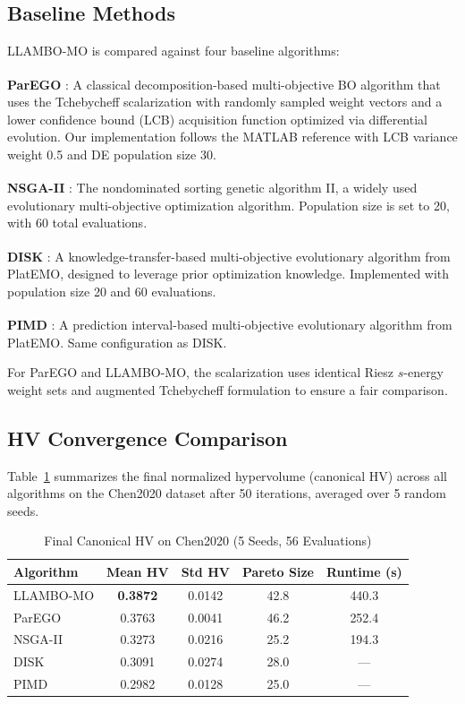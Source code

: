 \documentclass[lettersize,journal]{IEEEtran}
\let\OLDcite\cite
\renewcommand{\cite}[1]{\textsuperscript{\OLDcite{#1}}}
\begin{document}
\subsection{Baseline Methods}

LLAMBO-MO is compared against four baseline algorithms:

\textbf{ParEGO} \cite{ref_parego}: A classical decomposition-based multi-objective BO algorithm that uses the Tchebycheff scalarization with randomly sampled weight vectors and a lower confidence bound (LCB) acquisition function optimized via differential evolution. Our implementation follows the MATLAB reference with LCB variance weight 0.5 and DE population size 30.

\textbf{NSGA-II} \cite{ref_nsga2}: The nondominated sorting genetic algorithm II, a widely used evolutionary multi-objective optimization algorithm. Population size is set to 20, with 60 total evaluations.

\textbf{DISK} \cite{ref_platemo}: A knowledge-transfer-based multi-objective evolutionary algorithm from PlatEMO, designed to leverage prior optimization knowledge. Implemented with population size 20 and 60 evaluations.

\textbf{PIMD} \cite{ref_platemo}: A prediction interval-based multi-objective evolutionary algorithm from PlatEMO. Same configuration as DISK.

For ParEGO and LLAMBO-MO, the scalarization uses identical Riesz $s$-energy weight sets and augmented Tchebycheff formulation to ensure a fair comparison.

\subsection{HV Convergence Comparison}

Table~\ref{tab:hv_chen} summarizes the final normalized hypervolume (canonical HV) across all algorithms on the Chen2020 dataset after 50 iterations, averaged over 5 random seeds.

\begin{table}[!t]
\caption{Final Canonical HV on Chen2020 (5 Seeds, 56 Evaluations)}
\label{tab:hv_chen}
\centering
\footnotesize
\begin{tabular}{lcccc}
\toprule
Algorithm & Mean HV & Std HV & Pareto Size & Runtime (s) \\
\midrule
LLAMBO-MO & \textbf{0.3872} & 0.0142 & 42.8 & 440.3 \\
ParEGO    & 0.3763 & 0.0041 & 46.2 & 252.4 \\
NSGA-II   & 0.3273 & 0.0216 & 25.2 & 194.3 \\
DISK      & 0.3091 & 0.0274 & 28.0 & --- \\
PIMD      & 0.2982 & 0.0128 & 25.0 & --- \\
\bottomrule
\end{tabular}
\end{table}
\end{document}
